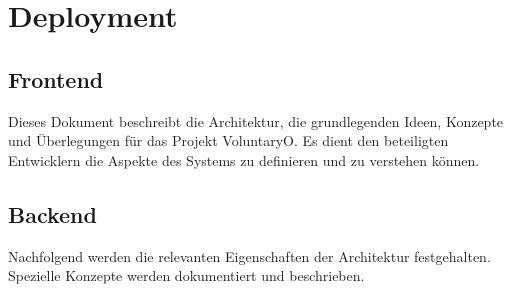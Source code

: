 \chapter{Deployment}
	\section{Frontend}
	Dieses Dokument beschreibt die Architektur, die grundlegenden Ideen, Konzepte und Überlegungen für das Projekt VoluntaryO. Es dient den beteiligten Entwicklern die Aspekte des Systems zu definieren und zu verstehen können.
	
	
	\section{Backend}
	Nachfolgend werden die relevanten Eigenschaften der Architektur festgehalten. Spezielle Konzepte werden dokumentiert und beschrieben.